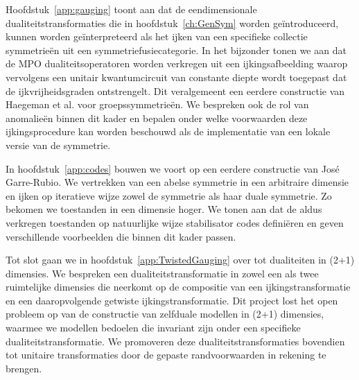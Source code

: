 Hoofdstuk~\ref{app:gauging} toont aan dat de eendimensionale dualiteitstransformaties die in hoofdstuk~\ref{ch:GenSym} worden ge\"introduceerd, kunnen worden ge\"interpreteerd als het ijken van een specifieke collectie symmetrie\"en uit een symmetriefusiecategorie. In het bijzonder tonen we aan dat de MPO dualiteitsoperatoren worden verkregen uit een ijkingsafbeelding waarop vervolgens een unitair kwantumcircuit van constante diepte wordt toegepast dat de ijkvrijheidsgraden ontstrengelt. Dit veralgemeent een eerdere constructie van Haegeman et al. voor groepssymmetrie\"en. We bespreken ook de rol van anomalie\"en binnen dit kader en bepalen onder welke voorwaarden deze ijkingsprocedure kan worden beschouwd als de implementatie van een lokale versie van de symmetrie.


In hoofdstuk~\ref{app:codes} bouwen we voort op een eerdere constructie van Jos\'e Garre-Rubio. We vertrekken van een abelse symmetrie in een arbitraire dimensie en ijken op iteratieve wijze zowel de symmetrie als haar duale symmetrie. Zo bekomen we toestanden in een dimensie hoger. We tonen aan dat de aldus verkregen toestanden op natuurlijke wijze stabilisator codes defini\"eren en geven verschillende voorbeelden die binnen dit kader passen.

Tot slot gaan we in hoofdstuk~\ref{app:TwistedGauging} over tot dualiteiten in (2+1) dimensies. We bespreken een dualiteitstransformatie in zowel een als twee ruimtelijke dimensies die neerkomt op de compositie van een ijkingstransformatie en een daaropvolgende getwiste ijkingstransformatie. Dit project lost het open probleem op van de constructie van zelfduale modellen in (2+1) dimensies, waarmee we modellen bedoelen die invariant zijn onder een specifieke dualiteitstransformatie. We promoveren deze dualiteitstransformaties bovendien tot unitaire transformaties door de gepaste randvoorwaarden in rekening te brengen.